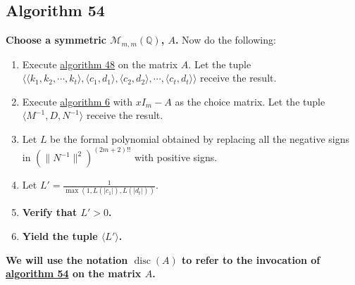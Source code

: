 \documentclass[twocolumn]{article}
\DeclareMathOperator{\disc}{disc}
\begin{document}
		\subsection{Algorithm 54}\label{sec:algorithm 54}
			\textbf{Choose a symmetric $\mathcal{M}_{m,m}(\mathbb{Q})$, $A$.} Now do the following:
			\begin{enumerate}
				\item Execute \hyperref[sec:algorithm 48]{algorithm 48} on the matrix $A$. Let the tuple $\langle\langle k_1,k_2,\cdots,k_t\rangle,\langle c_1,d_1\rangle,\langle c_2,d_2\rangle,\cdots,\langle c_t,d_t\rangle\rangle$ receive the result.
				\item Execute \hyperref[sec:algorithm 6]{algorithm 6} with $xI_m-A$ as the choice matrix. Let the tuple $\langle M^{-1},D,N^{-1}\rangle$ receive the result.
				\item Let $L$ be the formal polynomial obtained by replacing all the negative signs in $(\lVert N^{-1}\rVert^2)^{(2m+2)!!}$ with positive signs.
				\item Let $L'=\frac{1}{\max(1,L(\lvert c_1\rvert),L(\lvert d_t\rvert))}$.
				\item \textbf{Verify that $L'>0$.}
				\item \textbf{Yield the tuple $\langle L'\rangle$.}
			\end{enumerate}
			\textbf{We will use the notation $\disc(A)$ to refer to the invocation of \hyperref[sec:algorithm 54]{algorithm 54} on the matrix $A$.}
\end{document}
